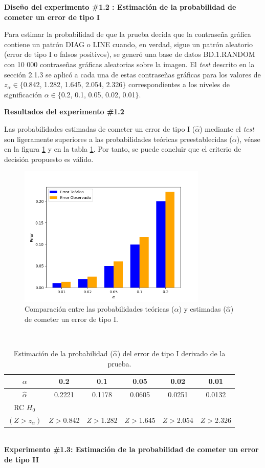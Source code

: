 \documentclass[12pt]{report}
\begin{document}
	\textbf{Diseño del experimento \#1.2 : Estimación de la probabilidad de cometer un error de tipo I} 
	
	Para estimar la probabilidad de que la prueba decida que la contraseña gráfica contiene un patrón DIAG o LINE cuando, en verdad, sigue un patrón aleatorio (error de tipo I o falsos positivos), se generó una base de datos BD.1.RANDOM con 10 000 contraseñas gráficas aleatorias sobre la imagen. El \textit{test} descrito en la sección 2.1.3 se aplicó a cada una de estas contraseñas gráficas para los valores de $z_\alpha \in \{$0.842, 1.282, 1.645, 2.054, 2.326$\}$ correspondientes a los niveles de significación $\alpha \in \{$0.2, 0.1, 0.05, 0.02, 0.01$\}$.
	


\textbf{Resultados del experimento \#1.2}

Las probabilidades estimadas de cometer un error de tipo I ($\hat{\alpha}$) mediante el \textit{test} son ligeramente superiores  a las probabilidades teóricas preestablecidas ($\alpha$), véase en la figura \ref{Teorico vs Observado} y en la tabla \ref{3td:error1-prob}. Por tanto, se puede concluir que el criterio de decisión propuesto es válido.
	\begin{figure}[ht]
	\centering
	
	\includegraphics[width=0.8\textwidth]{3td_teo_obs.png}
	\caption{Comparación entre las probabilidades teóricas ($\alpha$) y estimadas ($\hat{\alpha}$) de cometer un error de tipo I. }
	\label{Teorico vs Observado}
\end{figure}\\
\begin{table}[h!]
	\centering
	\begin{tabular}{|c|ccccc|}
		\hline
		$\alpha$ &  0.2 &  0.1 &  0.05 & 0.02 &  0.01 \\
		\hline
		$\hat{\alpha}$ & 0.2221 & 0.1178 & 0.0605 & 0.0251 & 0.0132 \\
		\hline
		RC $H_0$      &         &         &        &        &  \\
		 $(Z>z_\alpha)$&  $Z>$0.842& $Z>$1.282& $Z>$1.645& $Z>$2.054& $Z>$2.326 \\
		\hline
	\end{tabular}
	\caption{Estimación de la probabilidad ($\hat{\alpha}$) del error de tipo I derivado de la prueba.}
	\label{3td:error1-prob}
\end{table}
\\
\textbf{Experimento \#1.3: Estimación de la probabilidad de cometer un error de tipo II}
\end{document}
